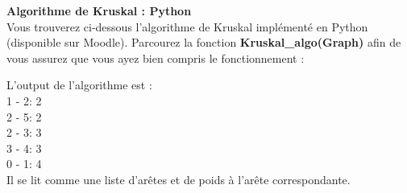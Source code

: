 \begin{Exercice}[15 minutes] \textbf{Algorithme de Kruskal : Python}\\
    Vous trouverez ci-dessous l'algorithme de Kruskal implémenté en Python (disponible sur Moodle). Parcourez la fonction \textbf{Kruskal\_algo(Graph)} afin de vous assurez que vous ayez bien compris le fonctionnement :\\
    
    \begin{conseil}
        L'output de l'algorithme est : \\
        1 - 2: 2\\
        2 - 5: 2\\
        2 - 3: 3\\
        3 - 4: 3\\
        0 - 1: 4\\
        Il se lit comme une liste d'arêtes et de poids à l'arête correspondante.
    \end{conseil}
\end{Exercice}


